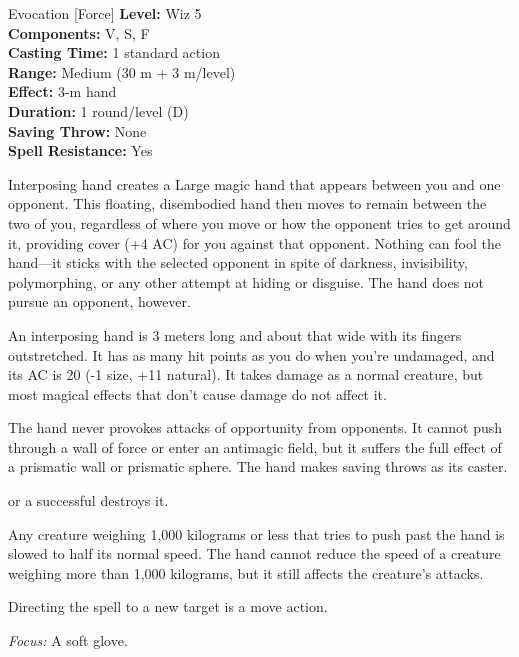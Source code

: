 {Evocation [Force]}
{
	\textbf{Level:}
	Wiz 5\\
	\textbf{Components:}
	V, S, F\\
	\textbf{Casting Time:}
	1 standard action\\
	\textbf{Range:}
	Medium (30 m + 3 m/level)\\
	\textbf{Effect:}
	3-m hand\\
	\textbf{Duration:}
	1 round/level (D)\\
	\textbf{Saving Throw:}
	None\\
	\textbf{Spell Resistance:}
	Yes\\
}
{
	Interposing hand creates a Large magic hand that appears between you and one opponent. This floating, disembodied hand then moves to remain between the two of you, regardless of where you move or how the opponent tries to get around it, providing cover (+4 AC) for you against that opponent. Nothing can fool the hand---it sticks with the selected opponent in spite of darkness, invisibility, polymorphing, or any other attempt at hiding or disguise. The hand does not pursue an opponent, however.

	An interposing hand is 3 meters long and about that wide with its fingers outstretched. It has as many hit points as you do when you're undamaged, and its AC is 20 (-1 size, +11 natural). It takes damage as a normal creature, but most magical effects that don't cause damage do not affect it.

	The hand never provokes attacks of opportunity from opponents. It cannot push through a wall of force or enter an antimagic field, but it suffers the full effect of a prismatic wall or prismatic sphere. The hand makes saving throws as its caster.

	 or a successful  destroys it.

	Any creature weighing 1,000 kilograms or less that tries to push past the hand is slowed to half its normal speed. The hand cannot reduce the speed of a creature weighing more than 1,000 kilograms, but it still affects the creature's attacks.

	Directing the spell to a new target is a move action.

	\textit{Focus:}
	A soft glove.

}
